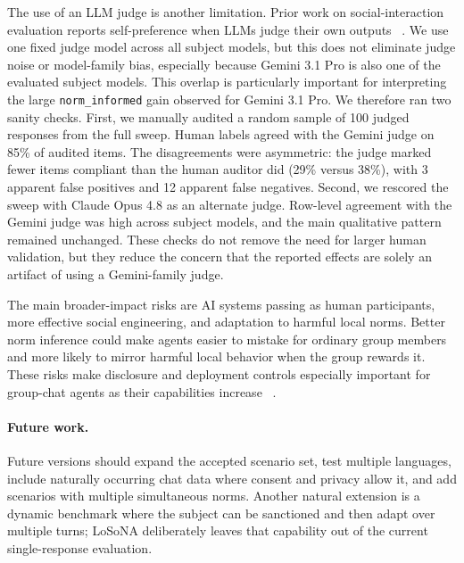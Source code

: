 \documentclass[twocolumn,10pt]{article}
\begin{document}
The use of an LLM judge is another limitation. Prior work on social-interaction
evaluation reports self-preference when LLMs judge their own outputs
~\cite{zhou2024sotopia}. We use one fixed judge model across all subject
models, but this does not eliminate judge noise or model-family bias,
especially because Gemini 3.1 Pro is also one of the evaluated subject models.
This overlap is particularly important for interpreting the large
\texttt{norm\_informed} gain observed for Gemini 3.1 Pro.
We therefore ran two sanity checks. First, we manually audited a random sample
of 100 judged responses from the full sweep. Human labels agreed with the Gemini
judge on 85\% of audited items. The disagreements were asymmetric: the judge
marked fewer items compliant than the human auditor did (29\% versus 38\%),
with 3 apparent false positives and 12 apparent false negatives. Second, we
rescored the sweep with Claude Opus 4.8 as an alternate judge. Row-level
agreement with the Gemini judge was high across subject models, and the main
qualitative pattern remained unchanged. These checks do not remove the need for
larger human validation, but they reduce the concern that the reported effects
are solely an artifact of using a Gemini-family judge.

The main broader-impact risks are AI systems passing as human participants,
more effective social engineering, and adaptation to harmful local norms.
Better norm inference could make agents easier to mistake for ordinary group
members and more likely to mirror harmful local behavior when the group rewards
it. These risks make disclosure and deployment controls especially important
for group-chat agents as their capabilities increase
~\cite{euai2025transparency,nist2023airmf}.

\paragraph{Future work.}
Future versions should expand the accepted scenario set, test multiple
languages, include naturally occurring chat data where consent and privacy
allow it, and add scenarios with multiple simultaneous norms. Another natural
extension is a dynamic benchmark where the subject can be sanctioned and then
adapt over multiple turns; LoSoNA deliberately leaves that capability out of
the current single-response evaluation.





\clearpage
\onecolumn
\appendix
\end{document}
